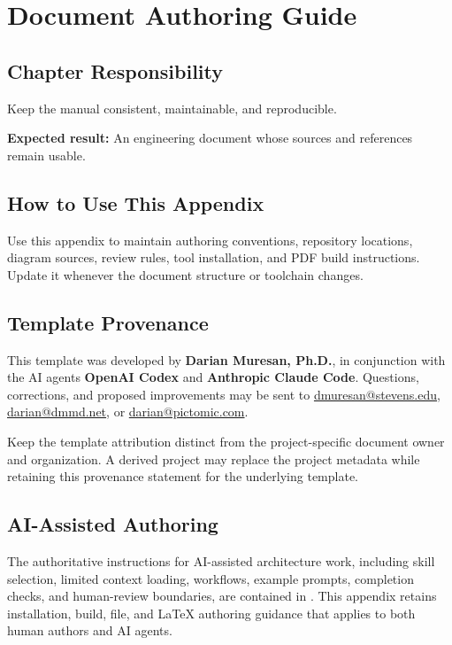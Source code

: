 \chapter{Document Authoring Guide}

\section{Chapter Responsibility}
\label{Section:DocumentGuideResponsibility}
Keep the manual consistent, maintainable, and reproducible.

\noindent\textbf{Expected result:} An engineering document whose sources and references remain usable.

\section{How to Use This Appendix}
Use this appendix to maintain authoring conventions, repository locations,
diagram sources, review rules, tool installation, and PDF build instructions.
Update it whenever the document structure or toolchain changes.

\section{Template Provenance}
This template was developed by \textbf{Darian Muresan, Ph.D.}, in conjunction
with the AI agents \textbf{OpenAI Codex} and
\textbf{Anthropic Claude Code}. Questions, corrections, and proposed
improvements may be sent to
\href{mailto:dmuresan@stevens.edu}{dmuresan@stevens.edu},
\href{mailto:darian@dmmd.net}{darian@dmmd.net}, or
\href{mailto:darian@pictomic.com}{darian@pictomic.com}.

Keep the template attribution distinct from the project-specific document
owner and organization. A derived project may replace the project metadata
while retaining this provenance statement for the underlying template.

\section{AI-Assisted Authoring}
The authoritative instructions for AI-assisted architecture work, including
skill selection, limited context loading, workflows, example prompts, completion
checks, and human-review boundaries, are contained in
. This appendix retains installation, build, file, and
LaTeX authoring guidance that applies to both human authors and AI agents.

